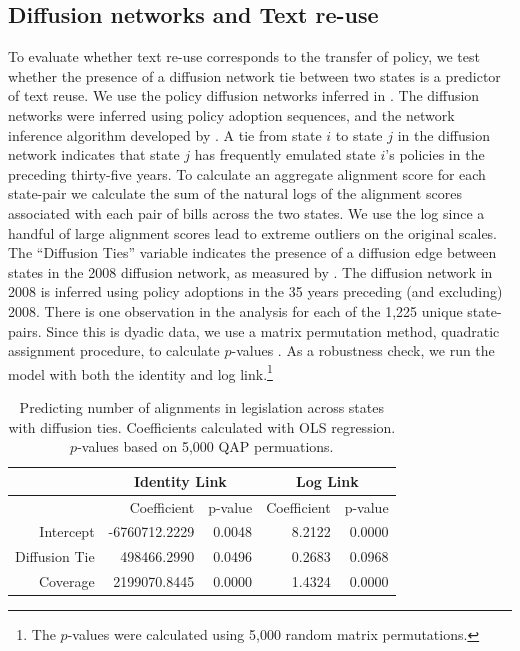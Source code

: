 \documentclass[12pt]{article} %
\begin{document}
\subsection{Diffusion networks and Text re-use}

To evaluate whether text re-use corresponds to the transfer of policy, we test whether the presence of a diffusion network tie between two states is a predictor of text reuse. We use the policy diffusion networks inferred in \citet{desmarais2015}. The diffusion networks were inferred using policy adoption sequences, and the network inference algorithm developed by \citet{gomez2010inferring}. A tie from state $i$ to state $j$ in the diffusion network indicates that state $j$ has frequently emulated state $i$'s policies in the preceding thirty-five years. To calculate an aggregate alignment score for each state-pair we calculate the sum of the natural logs of the alignment scores associated with each pair of bills across the two states. We use the log since a handful of large alignment scores lead to extreme outliers on the original scales. The ``Diffusion Ties'' variable indicates the presence of a diffusion edge between states in the 2008 diffusion network, as measured by \citet{desmarais2015}. The diffusion network in 2008 is inferred using policy adoptions in the 35 years preceding (and excluding) 2008.  There is one observation in the analysis for each of the 1,225 unique state-pairs. Since this is dyadic data, we use a matrix permutation method, quadratic assignment procedure, to calculate $p$-values \citep{krackhardt1988}. As a robustness check, we run the model with both the identity and log link.\footnote{The $p$-values were calculated using 5,000 random matrix permutations.}

\begin{table}[ht]
\centering
\begin{tabular}{rrrrr}
\hline
& \multicolumn{2}{c}{Identity Link} & \multicolumn{2}{c}{Log Link} \\
  \hline
 & Coefficient & p-value & Coefficient & p-value \\ 
  \hline
Intercept & -6760712.2229 & 0.0048 & 8.2122 & 0.0000 \\ 
  Diffusion Tie & 498466.2990 & 0.0496 & 0.2683 & 0.0968 \\ 
  Coverage & 2199070.8445 & 0.0000 & 1.4324 & 0.0000 \\ 
   \hline
\end{tabular}
\caption{Predicting number of alignments in legislation across states with diffusion ties. Coefficients calculated with OLS regression. $p$-values based on 5,000 QAP permuations.}
\label{tab:qap.diffusion}
\end{table}
\end{document}
